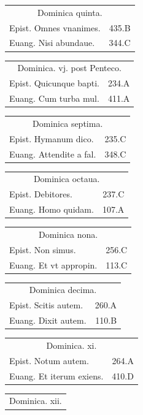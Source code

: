 \documentclass[a5paper,10pt]{book}
\begin{document}
\begin{multicols}{2}
\begin{tabular}{l r}
\end{tabular}
\begin{tabular}{l r}
\multicolumn{2}{c}{\color{red} Dominica quinta.}\\
Epist. Omnes vnanimes. & 435.B\\
Euang. Nisi abundaue. & 344.C\\
\end{tabular}
\begin{tabular}{l r}
\multicolumn{2}{c}{\color{red} Dominica. vj. post Penteco.}\\
Epist. Quicunque bapti. & 234.A\\
Euang. Cum turba mul. & 411.A\\
\end{tabular}
\begin{tabular}{l r}
\multicolumn{2}{c}{\color{red} Dominica septima.}\\
Epist. Hymanum dico. & 235.C\\
Euang. Attendite a fal. & 348.C\\
\end{tabular}
\begin{tabular}{l r}
\multicolumn{2}{c}{\color{red} Dominica octaua.}\\
Epist. Debitores. & 237.C\\
Euang. Homo quidam. & 107.A\\
\end{tabular}
\begin{tabular}{l r}
\multicolumn{2}{c}{\color{red} Dominica nona.}\\
Epist. Non simus. & 256.C\\
Euang. Et vt appropin. & 113.C\\
\end{tabular}
\begin{tabular}{l r}
\multicolumn{2}{c}{\color{red} Dominica decima.}\\
Epist. Scitis autem. & 260.A\\
Euang. Dixit autem. & 110.B\\
\end{tabular}
\begin{tabular}{l r}
\multicolumn{2}{c}{\color{red} Dominica. xi.}\\
Epist. Notum autem. & 264.A\\
Euang. Et iterum exiens. & 410.D\\
\end{tabular}
\begin{tabular}{l r}
\multicolumn{2}{c}{\color{red} Dominica. xii.}\\

\end{tabular}
\end{multicols}
\end{document}
